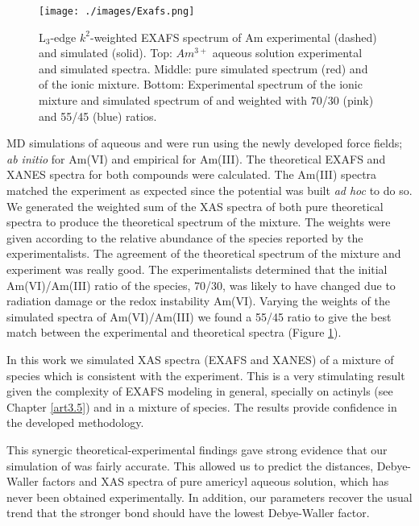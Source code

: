 \begin{figure}
\centering 
\texttt{[image: ./images/Exafs.png]}
\caption[EXAFS spectra of Am]{L$_\text{3}$-edge $k^2$-weighted EXAFS spectrum of Am 
experimental (dashed) and simulated 
(solid). Top: $Am^{3+}$ aqueous solution experimental\cite{EnvSciTech_Stumpf_2006} and simulated 
spectra. Middle: pure  simulated spectrum (red) and of the ionic 
mixture\cite{JRadioanNucChem_Riddle_2016}. Bottom: Experimental spectrum of the ionic 
mixture\cite{JRadioanNucChem_Riddle_2016} and simulated spectrum of  and 
 weighted with  70/30 (pink) and 55/45 (blue) ratios.}
\label{XAS_Am}
\end{figure}

MD simulations of aqueous  and 
 were run  using the newly developed force fields; \textit{ab initio} for 
Am(VI) and empirical for Am(III). The theoretical EXAFS and XANES spectra for both compounds were 
calculated. The Am(III) spectra matched the experiment as expected since the potential was built 
\textit{ad hoc} to do so. We 
generated the weighted sum of the XAS spectra of both pure 
theoretical spectra to produce the theoretical spectrum of the mixture. The weights were given 
according to the relative abundance of the species reported by the experimentalists. The agreement 
of the theoretical spectrum of the mixture and experiment was really good. The 
experimentalists determined that the initial Am(VI)/Am(III) ratio of the species, 70/30, was 
likely 
to have changed 
due to radiation damage or the redox instability Am(VI). Varying the weights of the simulated 
spectra of Am(VI)/Am(III) we found a 55/45 ratio to give the best match between the experimental 
and theoretical spectra (Figure \ref{XAS_Am}). 

In this work we simulated XAS spectra (EXAFS and XANES) of a 
mixture of species which is consistent with the experiment. This is a very stimulating 
result given the complexity of EXAFS modeling in general, specially on actinyls (see 
Chapter \ref{art3.5}) and in a mixture of species. The results provide confidence in the 
developed methodology.

This synergic theoretical-experimental findings gave strong evidence that our simulation of 
 was fairly accurate. This allowed us to predict the distances,
Debye-Waller factors and XAS spectra of pure americyl aqueous solution, which has never been 
obtained experimentally. In addition, our parameters recover the usual trend that the stronger 
bond 
should 
have the 
lowest Debye-Waller factor.

